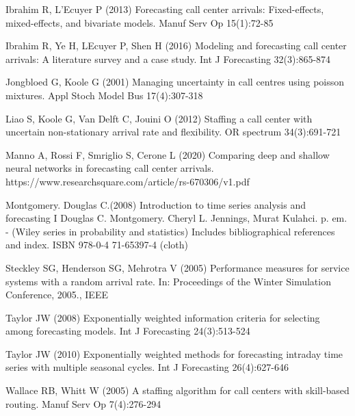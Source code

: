 \documentclass[12pt,a4paper]{article}
\theoremstyle{myplain}
\numberwithin{equation}{section}
\begin{document}
\begin{thebibliography}{X}
Ibrahim R, L'Ecuyer P (2013) Forecasting call center arrivals: Fixed-effects, mixed-effects, and bivariate models.
Manuf Serv Op 15(1):72-85

Ibrahim R, Ye H, LEcuyer P, Shen H (2016) Modeling and forecasting call center arrivals: A literature survey and a case study. 
Int J Forecasting 32(3):865-874

Jongbloed G, Koole G (2001) Managing uncertainty in call centres using poisson mixtures.
Appl Stoch Model Bus 17(4):307-318

Liao S, Koole G, Van Delft C, Jouini O (2012) Staffing a call center with uncertain non-stationary arrival rate and  flexibility.
OR spectrum 34(3):691-721

Manno A, Rossi F, Smriglio S, Cerone L (2020) Comparing deep and shallow neural networks in forecasting call center arrivals.
https://www.researchsquare.com/article/rs-670306/v1.pdf

Montgomery. Douglas C.(2008) Introduction to time series analysis and forecasting I Douglas C. Montgomery. Cheryl L. Jennings, Murat Kulahci. p. em. - (Wiley series in probability and statistics) Includes bibliographical references and index.
ISBN 978-0-4 71-65397-4 (cloth)

Steckley SG, Henderson SG, Mehrotra V (2005) Performance measures for service systems with a random arrival rate.
In: Proceedings of the Winter Simulation Conference, 2005., IEEE

Taylor JW (2008) Exponentially weighted information criteria for selecting among forecasting models.
Int J Forecasting 24(3):513-524

Taylor JW (2010) Exponentially weighted methods for forecasting intraday time series with multiple seasonal cycles.
Int J Forecasting 26(4):627-646

Wallace RB, Whitt W (2005) A staffing algorithm for call centers with skill-based routing.
Manuf Serv Op 7(4):276-294

\end{thebibliography}
\end{document}
